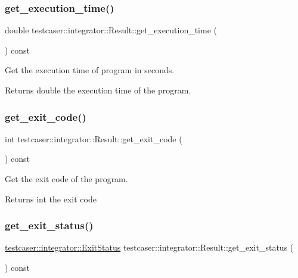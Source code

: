 \subsubsection{\texorpdfstring{get\_execution\_time()}{get\_execution\_time()}}
{\footnotesize\ttfamily double testcaser\+::integrator\+::\+Result\+::get\+\_\+execution\+\_\+time (\begin{DoxyParamCaption}{ }\end{DoxyParamCaption}) const\hspace{0.3cm}{\ttfamily [inline]}}



Get the execution time of program in seconds. 

\begin{DoxyReturn}{Returns}
double the execution time of the program. 
\end{DoxyReturn}
\mbox{\label{classtestcaser_1_1integrator_1_1Result_a0795d3307ac8c3186288020bc75b3767}} 
\subsubsection{\texorpdfstring{get\_exit\_code()}{get\_exit\_code()}}
{\footnotesize\ttfamily int testcaser\+::integrator\+::\+Result\+::get\+\_\+exit\+\_\+code (\begin{DoxyParamCaption}{ }\end{DoxyParamCaption}) const\hspace{0.3cm}{\ttfamily [inline]}}



Get the exit code of the program. 

\begin{DoxyReturn}{Returns}
int the exit code 
\end{DoxyReturn}
\mbox{\label{classtestcaser_1_1integrator_1_1Result_aadd7237340243c5506d1fbf23f30e9d5}} 
\subsubsection{\texorpdfstring{get\_exit\_status()}{get\_exit\_status()}}
{\footnotesize\ttfamily \mbox{\hyperlink{namespacetestcaser_1_1integrator_a68fcfdfd3f063954e9fd1a94f4b4f755}{testcaser\+::integrator\+::\+Exit\+Status}} testcaser\+::integrator\+::\+Result\+::get\+\_\+exit\+\_\+status (\begin{DoxyParamCaption}{ }\end{DoxyParamCaption}) const\hspace{0.3cm}{\ttfamily [inline]}}



